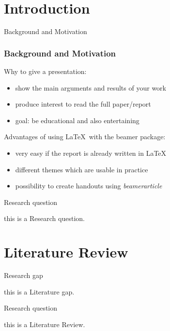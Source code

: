 \documentclass[serif, aspectratio=169]{beamer}
\begin{document}

\section{Introduction}
\begin{frame}{Background and Motivation}
	\frametitle<presentation>{Background and Motivation}
	\begin{block}{Why to give a presentation:}
		\begin{itemize}
			\item show the main arguments and results of your work
			\item produce interest to read the full paper/report
			\item goal: be educational and also entertaining
		\end{itemize}
	\end{block}
	\begin{block}{Advantages of using \LaTeX ~with the beamer package:}
		\begin{itemize}
			\item very easy if the report is already written in \LaTeX
			\item different themes which are usable in practice
			\item possibility to create handouts using \emph{beamerarticle}
		\end{itemize}
	\end{block}
\end{frame}

\begin{frame}{Research question}

   this is a Research question.

\end{frame}

\section{Literature Review}
\begin{frame}{Research gap}

   this is a Literature gap.

\end{frame}

\begin{frame}{Research question}

   this is a Literature Review.

\end{frame}
\end{document}
